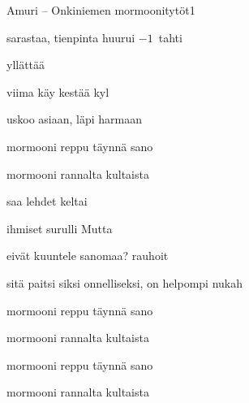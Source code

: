 \documentclass[12pt,a4paper]{article}
\begin{document}
\thispagestyle{empty}
\begin{mysong}{Amuri – Onkiniemen mormoonitytöt}{1}

\begin{SBVerse}
   sarastaa,  tienpinta huurui
  {\SBLyricNoteFont $-1$~tahti}

   yllättää  

   viima käy   kestää
  kyl 

   uskoo asiaan,   läpi harmaan
   
\end{SBVerse}

\begin{SBChorus}
   mormooni  reppu täynnä
  sano 

   mormooni  rannalta kultaista
   
\end{SBChorus}

\begin{SBVerse}
   saa  lehdet  keltai

   ihmiset surulli Mutta  

   eivät kuuntele  sanomaa? 
  rauhoit 

   sitä paitsi siksi  onnelliseksi,  on
  helpompi nukah 
\end{SBVerse}

\begin{SBChorus}
   mormooni  reppu täynnä
  sano 

   mormooni  rannalta kultaista
   
\end{SBChorus}


\begin{SBChorus}
   mormooni  reppu täynnä
  sano 

   mormooni  rannalta kultaista
   
\end{SBChorus}



\end{mysong}
\end{document}
